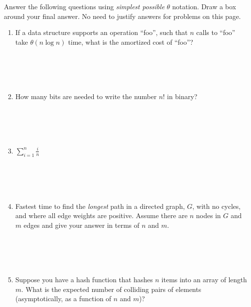 \documentclass[11pt]{article}
\newcommand{\ans}[1]{}
\begin{document}
\begin{enumerate}
 

 
Answer the following questions using \emph{simplest possible} $\theta$ notation.  Draw a box around your final answer.  No need to justify answers for problems on this page.
 
 \begin{enumerate}

\item If a data structure supports an operation ``foo'', such that $n$ calls to ``foo'' take $\theta(n \log n)$ time, what is the amortized cost of ``foo''?  \ans{It is $\theta(\log n)$} \\ \ \\ \ \\ \ \\ \ \\

\item How many bits are needed to write the number $n!$ in binary? \ans{$\theta(n \log n)$}  \\ \ \\ \ \\ \ \\ \ \\


\item $\sum_{i=1}^{n} \frac{i}{n}$ \ans{$\theta(n)$}  \\ \ \\ \ \\ \ \\ \ \\

\item Fastest time to find the \emph{longest} path in a directed graph, $G$, with no cycles, and where all edge weights are positive.  Assume there are $n$ nodes in $G$ and $m$ edges and give your answer in terms of $n$ and $m$. \ans{$\theta(nm)$} \\ \ \\ \ \\ \ \\ \ \\

\item Suppose you have a hash function that hashes $n$ items into an array of length $m$.  What is the expected number of colliding pairs of elements (asymptotically, as a function of $n$ and $m$)?
\ans{$\theta(n^{2}/m)$}

\pagebreak


\end{enumerate}
\end{enumerate}
\end{document}
